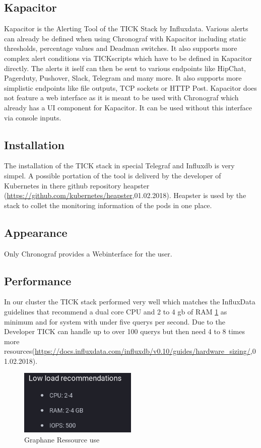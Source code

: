 \subsection{Kapacitor}
Kapacitor is the Alerting Tool of the TICK Stack by Influxdata. Various alerts can already be defined when using Chronograf with Kapacitor including static thresholds, percentage values and Deadman switches. It also supports more complex alert conditions via TICKscripts which have to be defined in Kapacitor directly.
The alerts it iself can then be sent to various endpoints like HipChat, Pagerduty, Pushover, Slack, Telegram and many more. It also supports more simplistic endpoints like file outputs, TCP sockets or HTTP Post.
Kapacitor does not feature a web interface as it is meant to be used with Chronograf which already has a UI component for Kapacitor. It can be used without this interface via console inputs.
\subsection{Installation}
The installation of the TICK stack in special Telegraf and Influxdb is very simpel. A possible portation of the tool is deliverd by the developer of Kubernetes in there github repository heapster (\url{https://github.com/kubernetes/heapster},01.02.2018). Heapster is used by the stack to collet the monitoring information of the pods in one place.
\subsection{Appearance}
Only Chronograf provides a Webinterface for the user.


\subsection{Performance}
In our cluster the TICK stack performed very well which matches the InfluxData guidelines that recommend a dual core CPU and 2 to 4 gb of RAM \cref{fig:TICK_recommendet} as minimum and for system with under five querys per second. Due to the Developer TICK can handle up to over 100 querys but then need 4 to 8 times more resources(\url{https://docs.influxdata.com/influxdb/v0.10/guides/hardware_sizing/},01.02.2018).
\begin{figure}
\centering
\includegraphics[width=0.5\textwidth]{Bilder/Performance/TICK_recommendet}
\caption{Graphane Ressource use}
\label{fig:TICK_recommendet}
\end{figure}

